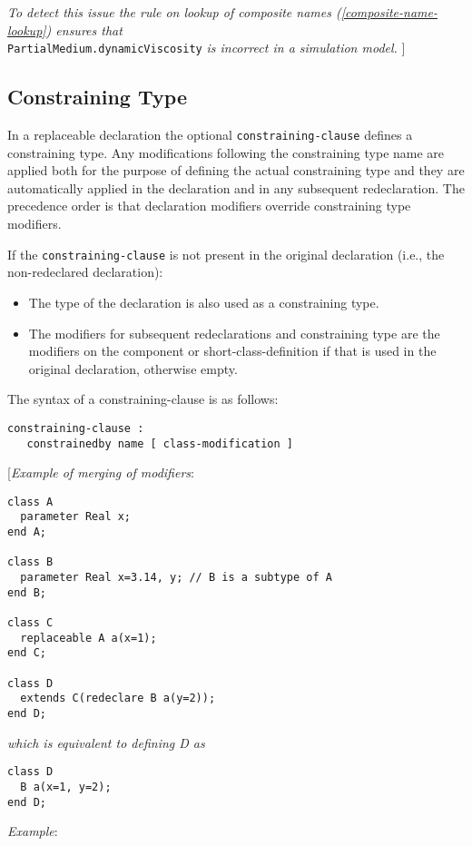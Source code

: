 \emph{To detect this issue the rule on lookup of composite names (\autoref{composite-name-lookup})
ensures that}\\ \lstinline!PartialMedium.dynamicViscosity! \emph{is incorrect in a
simulation model.}
{]}

\subsection{Constraining Type}

In a replaceable declaration the optional \lstinline!constraining-clause! defines a
constraining type. Any modifications following the constraining type
name are applied both for the purpose of defining the actual
constraining type and they are automatically applied in the declaration
and in any subsequent redeclaration. The precedence order is that
declaration modifiers override constraining type modifiers.

If the \lstinline!constraining-clause! is not present in the original declaration
(i.e., the non-redeclared declaration):

\begin{itemize}
\item
  The type of the declaration is also used as a constraining type.
\item
  The modifiers for subsequent redeclarations and constraining type are
  the modifiers on the component or short-class-definition if that is
  used in the original declaration, otherwise empty.
\end{itemize}

The syntax of a constraining-clause is as follows:
\begin{lstlisting}[language=grammar]
constraining-clause :
   constrainedby name [ class-modification ]
\end{lstlisting}
{[}\emph{Example of merging of modifiers}:
\begin{lstlisting}[language=modelica]
class A
  parameter Real x;
end A;

class B
  parameter Real x=3.14, y; // B is a subtype of A
end B;

class C
  replaceable A a(x=1);
end C;

class D
  extends C(redeclare B a(y=2));
end D;
\end{lstlisting}

\emph{which is equivalent to defining D as }
\begin{lstlisting}[language=modelica]
class D
  B a(x=1, y=2);
end D;
\end{lstlisting}
\emph{Example}:

